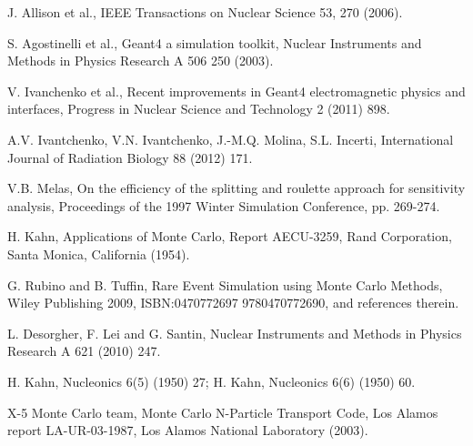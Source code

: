 \documentclass[final,5p,times,longtitle,twocolumn]{elsarticle}
\begin{document}
\begin{thebibliography}{00}

 J. Allison et al.,
                            IEEE Transactions on Nuclear Science 53, 270 (2006).







S. Agostinelli et al., Geant4 a simulation toolkit, 
                Nuclear Instruments and Methods in Physics Research A 506 250 (2003).

V. Ivanchenko et al., Recent improvements in Geant4 electromagnetic physics
                 and interfaces, Progress in Nuclear Science and Technology 2 (2011) 898.





 A.V. Ivantchenko, V.N. Ivantchenko, J.-M.Q. Molina, S.L. Incerti,
                   International Journal of Radiation Biology 88 (2012) 171.



 V.B. Melas, On the efficiency of the splitting and roulette approach 
                             for sensitivity analysis, Proceedings of the 1997 Winter
                             Simulation Conference, pp. 269-274.  

 H. Kahn, Applications of Monte Carlo, Report AECU-3259,
                            Rand Corporation, Santa Monica, California (1954).

 G. Rubino and B. Tuffin,
                          Rare Event Simulation using Monte Carlo Methods,
                          Wiley Publishing 2009,
                          ISBN:0470772697 9780470772690,
                          and references therein.

 L. Desorgher, F. Lei and G. Santin, Nuclear Instruments and Methods
                    in Physics Research A 621 (2010) 247.

 H. Kahn, Nucleonics 6(5) (1950) 27;
                      H. Kahn, Nucleonics 6(6) (1950) 60.


 X-5 Monte Carlo team, Monte Carlo N-Particle Transport Code, 
                   Los Alamos report LA-UR-03-1987,
                   Los Alamos National Laboratory (2003).


\end{thebibliography}
\end{document}
